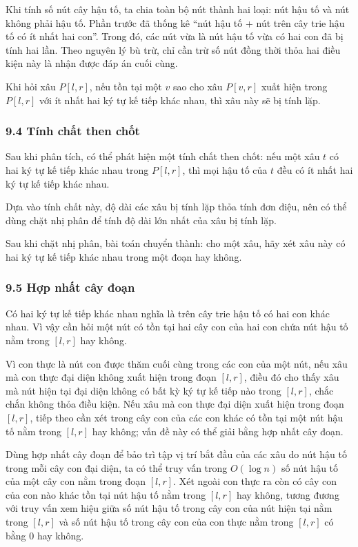 \documentclass[11pt]{article}
\begin{document}
Khi tính số nút cây hậu tố, ta chia toàn bộ nút thành hai loại: nút hậu tố và
nút không phải hậu tố. Phần trước đã thống kê ``nút hậu tố + nút trên cây trie
hậu tố có ít nhất hai con''. Trong đó, các nút vừa là nút hậu tố vừa có hai con
đã bị tính hai lần. Theo nguyên lý bù trừ, chỉ cần trừ số nút đồng thời thỏa
hai điều kiện này là nhận được đáp án cuối cùng.

Khi hỏi xâu \(P[l,r]\), nếu tồn tại một \(v\) sao cho xâu \(P[v,r]\) xuất hiện
trong \(P[l,r]\) với ít nhất hai ký tự kế tiếp khác nhau, thì xâu này sẽ bị tính
lặp.

\subsubsection*{9.4 Tính chất then chốt}

Sau khi phân tích, có thể phát hiện một tính chất then chốt: nếu một xâu \(t\)
có hai ký tự kế tiếp khác nhau trong \(P[l,r]\), thì mọi hậu tố của \(t\) đều có
ít nhất hai ký tự kế tiếp khác nhau.

Dựa vào tính chất này, độ dài các xâu bị tính lặp thỏa tính đơn điệu, nên có
thể dùng chặt nhị phân để tính độ dài lớn nhất của xâu bị tính lặp.

Sau khi chặt nhị phân, bài toán chuyển thành: cho một xâu, hãy xét xâu này có
hai ký tự kế tiếp khác nhau trong một đoạn hay không.

\subsubsection*{9.5 Hợp nhất cây đoạn}

Có hai ký tự kế tiếp khác nhau nghĩa là trên cây trie hậu tố có hai con khác
nhau. Vì vậy cần hỏi một nút có tồn tại hai cây con của hai con chứa nút hậu tố
nằm trong \([l,r]\) hay không.

Vì con thực là nút con được thăm cuối cùng trong các con của một nút, nếu xâu
mà con thực đại diện không xuất hiện trong đoạn \([l,r]\), điều đó cho thấy xâu
mà nút hiện tại đại diện không có bất kỳ ký tự kế tiếp nào trong \([l,r]\), chắc
chắn không thỏa điều kiện. Nếu xâu mà con thực đại diện xuất hiện trong đoạn
\([l,r]\), tiếp theo cần xét trong cây con của các con khác có tồn tại một nút
hậu tố nằm trong \([l,r]\) hay không; vấn đề này có thể giải bằng hợp nhất cây
đoạn.

Dùng hợp nhất cây đoạn để bảo trì tập vị trí bắt đầu của các xâu do nút hậu tố
trong mỗi cây con đại diện, ta có thể truy vấn trong \(O(\log n)\) số nút hậu tố
của một cây con nằm trong đoạn \([l,r]\). Xét ngoài con thực ra còn có cây con
của con nào khác tồn tại nút hậu tố nằm trong \([l,r]\) hay không, tương đương
với truy vấn xem hiệu giữa số nút hậu tố trong cây con của nút hiện tại nằm
trong \([l,r]\) và số nút hậu tố trong cây con của con thực nằm trong \([l,r]\)
có bằng \(0\) hay không.
\end{document}
